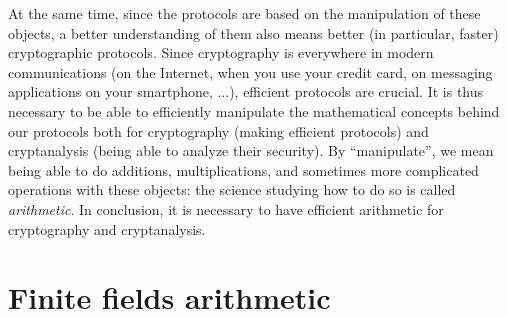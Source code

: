 At the same time, since the protocols are based on the manipulation of these
objects, a better understanding of them also means better (in particular,
faster) cryptographic protocols. Since cryptography is everywhere in modern
communications (on the Internet, when you use your credit card, on messaging
applications on your smartphone, ...), efficient protocols are crucial. It is
thus necessary to be able to efficiently manipulate the mathematical concepts
behind our protocols both for cryptography (making efficient protocols) and
cryptanalysis (being able to analyze their security). By ``manipulate'', we mean
being able to do additions, multiplications, and sometimes more complicated
operations with these objects: the science studying how to do so is called
\emph{arithmetic}. In conclusion, it is necessary to have efficient arithmetic
for cryptography and cryptanalysis.

\section{Finite fields arithmetic}

